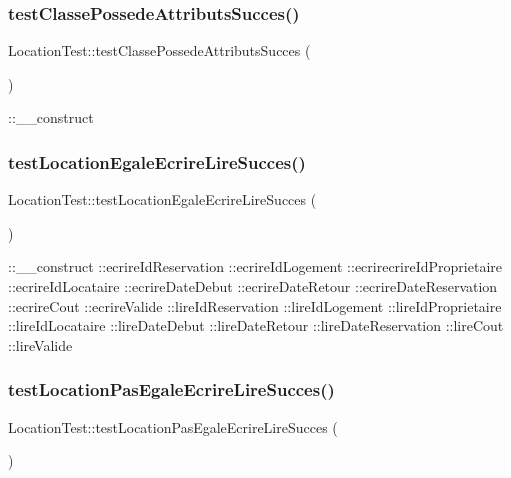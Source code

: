 \subsubsection{\texorpdfstring{test\+Classe\+Possede\+Attributs\+Succes()}{testClassePossedeAttributsSucces()}}
{\footnotesize\ttfamily Location\+Test\+::test\+Classe\+Possede\+Attributs\+Succes (\begin{DoxyParamCaption}{ }\end{DoxyParamCaption})}

\+::\+\_\+\+\_\+construct \mbox{\label{class_location_test_a285e512b70169d88ec12b85e72563a6b}} 
\subsubsection{\texorpdfstring{test\+Location\+Egale\+Ecrire\+Lire\+Succes()}{testLocationEgaleEcrireLireSucces()}}
{\footnotesize\ttfamily Location\+Test\+::test\+Location\+Egale\+Ecrire\+Lire\+Succes (\begin{DoxyParamCaption}{ }\end{DoxyParamCaption})}

\+::\+\_\+\+\_\+construct  \+::ecrire\+Id\+Reservation  \+::ecrire\+Id\+Logement  \+::ecrirecrire\+Id\+Proprietaire  \+::ecrire\+Id\+Locataire  \+::ecrire\+Date\+Debut  \+::ecrire\+Date\+Retour  \+::ecrire\+Date\+Reservation  \+::ecrire\+Cout  \+::ecrire\+Valide  \+::lire\+Id\+Reservation  \+::lire\+Id\+Logement  \+::lire\+Id\+Proprietaire  \+::lire\+Id\+Locataire  \+::lire\+Date\+Debut  \+::lire\+Date\+Retour  \+::lire\+Date\+Reservation  \+::lire\+Cout  \+::lire\+Valide \mbox{\label{class_location_test_a6ad1937baef793c562be46e4ff96f0ec}} 
\subsubsection{\texorpdfstring{test\+Location\+Pas\+Egale\+Ecrire\+Lire\+Succes()}{testLocationPasEgaleEcrireLireSucces()}}
{\footnotesize\ttfamily Location\+Test\+::test\+Location\+Pas\+Egale\+Ecrire\+Lire\+Succes (\begin{DoxyParamCaption}{ }\end{DoxyParamCaption})}

